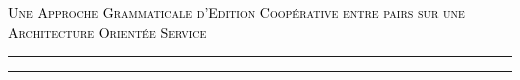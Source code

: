 \begin{center}
\chaptitlefont %
\begin{center}\textcolor{black}{\textsc{Une Approche Grammaticale d'Edition Coop\'erative entre pairs sur une Architecture Orient\'ee Service}}
\end{center}
\end{center}
\vspace{8mm}
\textcolor{black}{\hrule height 4.5pt}%
\vspace{1mm}
\textcolor{black}{\hrule height 1.5pt}
